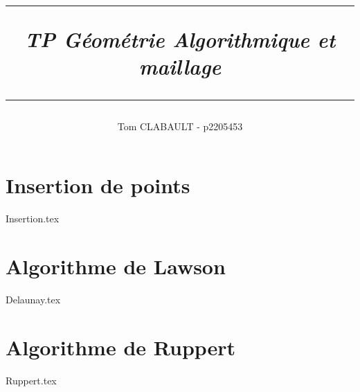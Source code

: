 \documentclass[11pt]{article}
\author{Tom CLABAULT - p2205453\\}
\title{
	\noindent\rule{\textwidth}{1pt}
	\textit{\textbf{TP Géométrie Algorithmique et maillage}}\\
	\noindent\rule{\textwidth}{1pt}
	\vskip 1cm
}
\begin{document}
	
	\maketitle
	
	\section {Insertion de points}
	 {Insertion.tex}
	\section {Algorithme de Lawson}
	 {Delaunay.tex}
	\section {Algorithme de Ruppert}
	 {Ruppert.tex}
\end{document}
